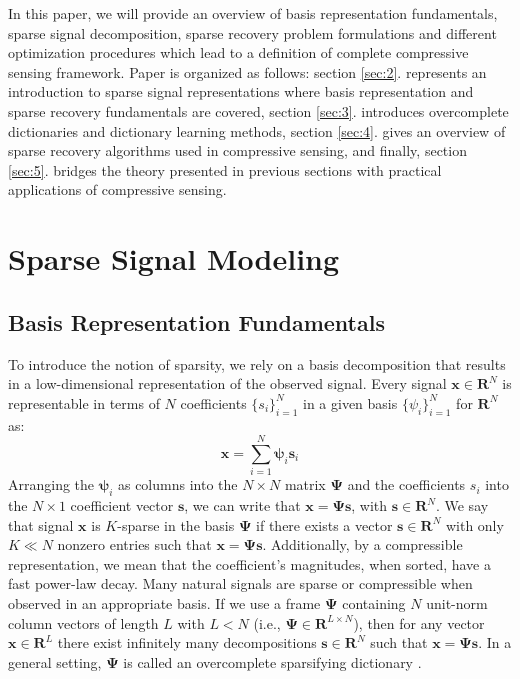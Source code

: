 \documentclass[journal]{IEEEtran}
\begin{document}
In this paper, we will provide an overview of basis representation fundamentals, sparse signal decomposition, sparse recovery problem formulations and different optimization procedures which lead to a definition of complete compressive sensing framework. Paper is organized as follows: section \ref{sec:2}. represents an introduction to sparse signal representations where basis representation and sparse recovery fundamentals are covered, section \ref{sec:3}. introduces overcomplete dictionaries and dictionary learning methods, section \ref{sec:4}. gives an overview of sparse recovery algorithms used in compressive sensing, and finally, section \ref{sec:5}. bridges the theory presented in previous sections with practical applications of compressive sensing.

\section{Sparse Signal Modeling} \label{sec:1}
\subsection{Basis Representation Fundamentals}
To introduce the notion of sparsity, we rely on a basis decomposition that results in a low-dimensional representation of the observed signal. Every signal $\boldsymbol{x}\in\mathbf{R}^N$ is representable in terms of $N$ coefficients $\{s_i\}_{i=1}^N$ in a given basis $\{\psi_i\}_{i=1}^{N}$ for $\mathbf{R}^N$ as:
%
\begin{equation} \label{eq:basis_rep}
	\boldsymbol{x}= \sum\limits_{i=1}^N \boldsymbol{\psi}_i \boldsymbol{s}_i
\end{equation}
%
Arranging the $\boldsymbol{\psi}_i$ as columns into the $N\times N$ matrix $\boldsymbol{\Psi}$ and the coefficients $s_i$ into the $N\times 1$ coefficient vector $\boldsymbol{s}$, we can write that $\boldsymbol{x}=\boldsymbol{\Psi} \boldsymbol{s}$, with $\boldsymbol{s}\in\mathbf{R}^N$. We say that signal $\boldsymbol{x}$ is $K$-sparse in the basis $\boldsymbol{\Psi}$ if there exists a vector $\boldsymbol{s}\in\mathbf{R}^N$ with only $K\ll N$ nonzero entries such that $\boldsymbol{x}=\boldsymbol{\Psi} \boldsymbol{s}$. Additionally, by a compressible representation, we mean that the coefficient's magnitudes, when sorted, have a fast power-law decay. Many natural signals are sparse or compressible when observed in an appropriate basis. If we use a frame $\boldsymbol{\Psi}$ containing $N$ unit-norm column vectors of length $L$ with $L<N$ (i.e., $\boldsymbol{\Psi}\in \mathbf{R}^{L\times N}$), then for any  vector $\boldsymbol{x}\in \mathbf{R}^L$ there exist infinitely many decompositions $\boldsymbol{s} \in \mathbf{R}^N$ such that $\boldsymbol{x}=\boldsymbol{\Psi} \boldsymbol{s}$. In a general setting, $\boldsymbol{\Psi}$ is called an overcomplete sparsifying dictionary \cite{Duarte2011}.
\end{document}
